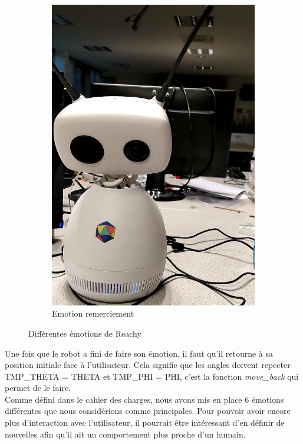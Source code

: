 \documentclass[a4paper,french]{article}
\begin{document}
\begin{figure}[!ht]
\begin{subfigure}{0.25\textwidth}
        \includegraphics[width=\textwidth]{figures/remerciement.png}
        \caption{Emotion remerciement}
        \label{remerciement}
    \end{subfigure}
    \caption{Différentes émotions de Reachy}
\end{figure}

Une fois que le robot a fini de faire son émotion, il faut qu'il retourne à sa position initiale face à l'utilisateur. Cela signifie que les angles doivent repecter TMP\_THETA = THETA et TMP\_PHI = PHI, c'est la fonction \textit{move\_back} qui permet de le faire.\\

Comme défini dans le cahier des charges, nous avons mis en place 6 émotions différentes que nous considérions comme principales. Pour pouvoir avoir encore plus d'interaction avec l'utilisateur, il pourrait être intéressant d'en définir de nouvelles afin qu'il ait un comportement plus proche d'un humain.
\end{document}

